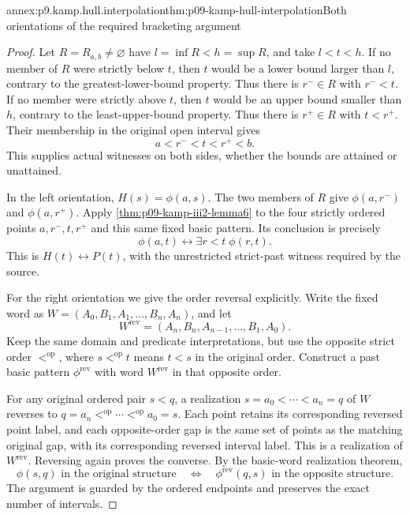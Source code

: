 \begin{annexitem}{annex:p9.kamp.hull.interpolation}{thm:p09-kamp-hull-interpolation}{Both orientations of the required bracketing argument}
\begin{proof}
Let \(R=R_{a,b}\ne\varnothing\) have \(l=\inf R<h=\sup R\),
and take \(l<t<h\). If no member of \(R\) were strictly
below \(t\), then \(t\) would be a lower bound larger than
\(l\), contrary to the greatest-lower-bound property. Thus
there is \(r^-\in R\) with \(r^-<t\).
If no member were strictly above \(t\), then \(t\) would
be an upper bound smaller than \(h\), contrary to the
least-upper-bound property. Thus there is \(r^+\in R\)
with \(t<r^+\). Their membership in the original open interval gives
\[
                           a<r^-<t<r^+<b.
 \tag{1}
\]
This supplies actual witnesses on both sides, whether the bounds
are attained or unattained.

In the left orientation, \(H(s)=\phi(a,s)\). The two
members of \(R\) give \(\phi(a,r^-)\) and
\(\phi(a,r^+)\). Apply \cref{thm:p09-kamp-iii2-lemma6}
to the four strictly ordered points \(a,r^-,t,r^+\) and
this same fixed basic pattern. Its conclusion is precisely
\[
                   \phi(a,t)\longleftrightarrow
                               \exists r<t\;\phi(r,t).
\]
This is \(H(t)\longleftrightarrow P(t)\), with the
unrestricted strict-past witness required by the source.

For the right orientation we give the order reversal explicitly.
Write the fixed word as
\(W=(A_0,B_1,A_1,\ldots,B_n,A_n)\), and let
\[
                    W^{\mathrm{rev}}=(A_n,B_n,A_{n-1},\ldots,B_1,A_0).
\]
Keep the same domain and predicate interpretations, but use the
opposite strict order \(<^{\mathrm{op}}\), where
\(s<^{\mathrm{op}}t\) means \(t<s\) in the original order.
Construct a past basic pattern \(\phi^{\mathrm{rev}}\)
with word \(W^{\mathrm{rev}}\) in that opposite order.

For any original ordered pair \(s<q\), a realization
\(s=a_0<\cdots<a_n=q\) of \(W\) reverses to
\(q=a_n<^{\mathrm{op}}\cdots<^{\mathrm{op}}a_0=s\).
Each point retains its corresponding reversed point label, and
each opposite-order gap is the same set of points as the matching
original gap, with its corresponding reversed interval label.
This is a realization of \(W^{\mathrm{rev}}\). Reversing
again proves the converse. By the basic-word realization theorem,
\[
 \phi(s,q)\text{ in the original structure}
 \quad\Longleftrightarrow\quad
 \phi^{\mathrm{rev}}(q,s)\text{ in the opposite structure}.
 \tag{2}
\]
The argument is guarded by the ordered endpoints and preserves
the exact number of intervals.


\end{proof}
\end{annexitem}
